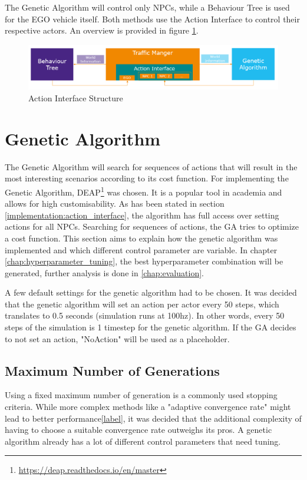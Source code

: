 The Genetic Algorithm will control only NPCs, while a Behaviour Tree is used for the EGO vehicle itself. Both methods use the Action Interface to control their respective actors. An overview is provided in figure \ref{figure:traffic_manager:structure}.

\begin{figure}[ht] 
	\includegraphics[width=1\linewidth]{figures/tm_structure}
	\caption{Action Interface Structure}
	\label{figure:traffic_manager:structure}
\end{figure}

\section{Genetic Algorithm}
The Genetic Algorithm will search for sequences of actions that will result in the most interesting scenarios according to its cost function.
For implementing the Genetic Algorithm, DEAP\footnote{\url{https://deap.readthedocs.io/en/master}} was chosen. It is a popular tool in academia and allows for high customisability.
As has been stated in section \ref{implementation:action_interface}, the algorithm has full access over setting actions for all NPCs. Searching for sequences of actions, the GA tries to optimize a cost function. This section aims to explain how the genetic algorithm was implemented and which different control parameter are variable. In chapter \ref{chap:hyperparameter_tuning}, the best hyperparameter combination will be generated, further analysis is done in \ref{chap:evaluation}.

A few default settings for the genetic algorithm had to be chosen. It was decided that the genetic algorithm will set an action per actor every 50 steps, which translates to 0.5 seconds (simulation runs at 100hz). In other words, every 50 steps of the simulation is 1 timestep for the genetic algorithm. If the GA decides to not set an action, "NoAction" will be used as a placeholder.

\subsection{Maximum Number of Generations}
Using a fixed maximum number of generation is a commonly used stopping criteria. While more complex methods like a "adaptive convergence rate" might lead to better performance\ref{label}, it was decided that the additional complexity of having to choose a suitable convergence rate outweighs its pros. A genetic algorithm already has a lot of different control parameters that need tuning.


